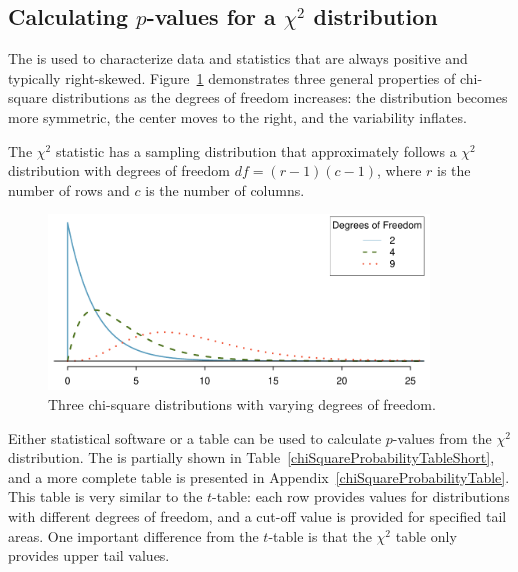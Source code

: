 \subsection{Calculating $p$-values for a $\chi^2$ distribution}

The  is used to characterize data and statistics that are always positive and typically right-skewed. Figure~\ref{chiSquareDistributionWithInceasingDF} demonstrates three general properties of chi-square distributions as the degrees of freedom increases: the distribution becomes more symmetric, the center moves to the right, and the variability inflates.

The $\chi^2$ statistic has a sampling distribution that approximately follows a $\chi^2$ distribution with degrees of freedom $df = (r-1)(c-1)$, where $r$ is the number of rows and $c$ is the number of columns.

\begin{figure}[h]
	\centering
	\includegraphics[width=0.9\textwidth]{ch_inference_for_props_oi_biostat/figures/chiSquareDistributionWithInceasingDF/chiSquareDistributionWithInceasingDF}
	\caption{Three chi-square distributions with varying degrees of freedom.}
	\label{chiSquareDistributionWithInceasingDF}
\end{figure}

Either statistical software or a table can be used to calculate $p$-values from the $\chi^2$ distribution. The  is partially shown in Table~\ref{chiSquareProbabilityTableShort}, and a more complete table is presented in Appendix~\vref{chiSquareProbabilityTable}. This table is very similar to the $t$-table: each row provides values for distributions with different degrees of freedom, and a cut-off value is provided for specified tail areas. One important difference from the $t$-table is that the $\chi^2$ table only provides upper tail values.

